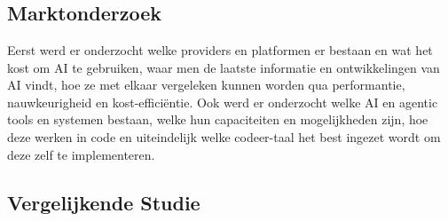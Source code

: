 
\chapter{}%
\label{ch:methodologie}



\section{Marktonderzoek}
\label{sec:marktonderzoek}
Eerst werd er onderzocht welke providers en platformen er bestaan en wat het kost om AI te gebruiken, waar men de laatste informatie en ontwikkelingen van AI vindt, hoe ze met elkaar vergeleken kunnen worden qua performantie, nauwkeurigheid en kost-efficiëntie. Ook werd er onderzocht welke AI en agentic tools en systemen bestaan, welke hun capaciteiten en mogelijkheden zijn, hoe deze werken in code en uiteindelijk welke codeer-taal het best ingezet wordt om deze zelf te implementeren.

\section{Vergelijkende Studie}
\label{sec:vergelijkendestudie}

